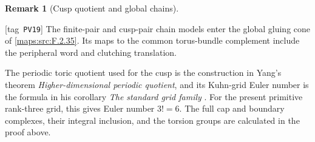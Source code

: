 \documentclass[11pt,a4paper]{article}
\numberwithin{equation}{section}
\theoremstyle{definition}
\newtheorem{remark}[remark]{Remark}
\newcommand{\StatementRecord}[4]{{\upshape\footnotesize[tag~\texttt{#3}]}\enspace\ignorespaces}
\begin{document}
\begin{remark}[Cusp quotient and global chains]\hypertarget{tag-PV19}{}\label{rem:V:cusp-input-and-global-chains}
\StatementRecord{rem:V:cusp-input-and-global-chains}{proved}{PV19}{}
The finite-pair and cusp-pair chain models enter the global
gluing cone of \cref{maps:src:F.2.35}. Its maps to the common
torus-bundle complement include the peripheral word and clutching
translation.

The periodic toric quotient used for the cusp is the construction in
Yang's theorem \emph{Higher-dimensional periodic quotient}, and its
Kuhn-grid Euler number is the formula in his corollary
\emph{The standard grid family}
\cite[Theorem 8.7, pp.~57--59, and Corollary 8.8, p.~59, arXiv v1]{Yang2026}.
For the present primitive rank-three grid, this gives Euler number
$3!=6$.  The full cap and boundary complexes, their integral inclusion,
and the torsion groups are calculated in the proof above.
\end{remark}
\end{document}
